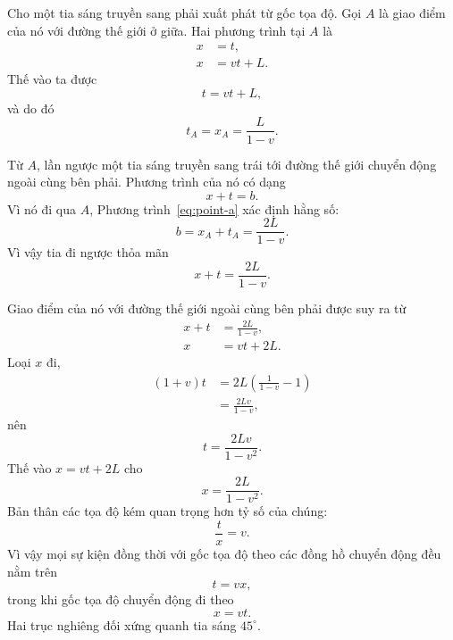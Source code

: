 Cho một tia sáng truyền sang phải xuất phát từ gốc tọa độ. Gọi \(A\) là giao điểm của nó với đường thế giới ở giữa. Hai phương trình tại \(A\) là
\begin{align}
x&=t,\\
x&=vt+L.
\end{align}
Thế vào ta được
\begin{equation}
t=vt+L,
\end{equation}
và do đó
\begin{equation}
t_A=x_A=\frac{L}{1-v}.
\label{eq:point-a}
\end{equation}

Từ \(A\), lần ngược một tia sáng truyền sang trái tới đường thế giới chuyển động ngoài cùng bên phải. Phương trình của nó có dạng
\begin{equation}
x+t=b.
\end{equation}
Vì nó đi qua \(A\), Phương trình~\eqref{eq:point-a} xác định hằng số:
\begin{equation}
b=x_A+t_A=\frac{2L}{1-v}.
\end{equation}
Vì vậy tia đi ngược thỏa mãn
\begin{equation}
x+t=\frac{2L}{1-v}.
\label{eq:backward-ray}
\end{equation}

Giao điểm của nó với đường thế giới ngoài cùng bên phải được suy ra từ
\begin{align}
x+t&=\frac{2L}{1-v},\\
x&=vt+2L.
\end{align}
Loại \(x\) đi,
\begin{align}
(1+v)t
  &=2L\left(\frac{1}{1-v}-1\right)\\
  &=\frac{2Lv}{1-v},
\end{align}
nên
\begin{equation}
t=\frac{2Lv}{1-v^2}.
\end{equation}
Thế vào \(x=vt+2L\) cho
\begin{equation}
x=\frac{2L}{1-v^2}.
\end{equation}
Bản thân các tọa độ kém quan trọng hơn tỷ số của chúng:
\begin{equation}
\frac{t}{x}=v.
\end{equation}
Vì vậy mọi sự kiện đồng thời với gốc tọa độ theo các đồng hồ chuyển động đều nằm trên
\begin{equation}
t=vx,
\label{eq:simultaneity-c-one}
\end{equation}
trong khi gốc tọa độ chuyển động đi theo
\begin{equation}
x=vt.
\label{eq:moving-time-axis}
\end{equation}
Hai trục nghiêng đối xứng quanh tia sáng \(45^\circ\).

